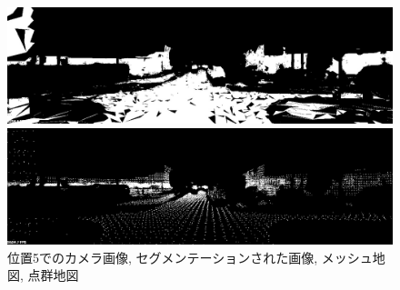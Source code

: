 \begin{figure}[htbp]
\begin{minipage}[b]{0.50\hsize}
\begin{center}
  \end{center}
 \end{minipage}\\
  \begin{minipage}[b]{0.50\hsize}
 \begin{center}
  \includegraphics[keepaspectratio, scale=0.18]{./picture/valued_mesh_map_image/image4.jpg}
  \end{center}
 \end{minipage}
 \begin{minipage}[b]{0.50\hsize}
 \begin{center}
  \includegraphics[keepaspectratio, scale=0.18]{./picture/valued_point_map_image/image4.jpg}
  \end{center}
 \end{minipage}
 \caption{位置5でのカメラ画像, セグメンテーションされた画像, メッシュ地図, 点群地図}\label{fig:place5}
\end{figure}


